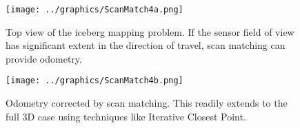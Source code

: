 %
\begin{figure}[!htb]
   \centering
   \texttt{[image: ../graphics/ScanMatch4a.png]} %
   \caption{Top view of the iceberg mapping problem. If the sensor field of view has significant extent in the direction of travel, scan matching can provide odometry.}
   \label{fig:ScanMatch1}
   \end{figure}
    \begin{figure}[h]
   \centering
   \texttt{[image: ../graphics/ScanMatch4b.png]} %
   \caption{Odometry corrected by scan matching. This readily extends to the full 3D case using techniques like Iterative Closest Point.}
   \label{fig:ScanMatch2}
\end{figure}


